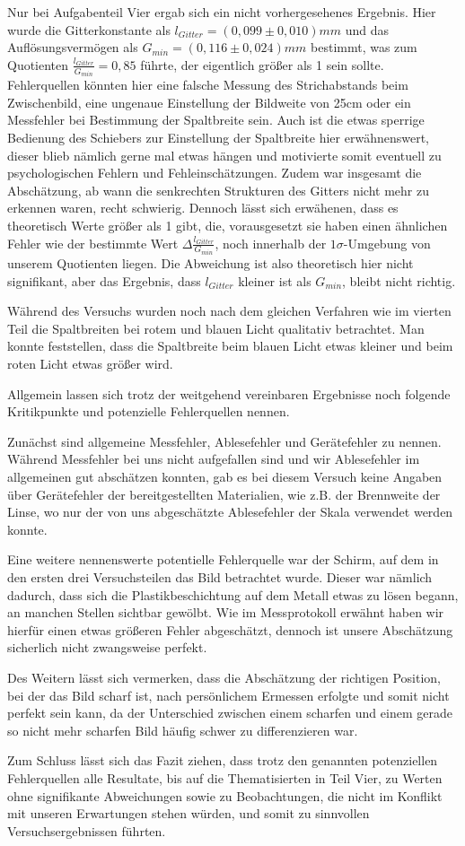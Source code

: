 \documentclass{article}
\begin{document}
Nur bei Aufgabenteil Vier ergab sich ein nicht vorhergesehenes Ergebnis. Hier wurde die Gitterkonstante als $l_{Gitter} = (0,099 \pm 0,010) mm$ und das Auflösungsvermögen als $G_{min} = (0,116 \pm 0,024)mm$ bestimmt, was zum Quotienten $\frac{l_{Gitter}}{G_{min}} = 0,85$ führte, der eigentlich größer als 1 sein sollte. Fehlerquellen könnten hier eine falsche Messung des Strichabstands beim Zwischenbild, eine ungenaue Einstellung der Bildweite von 25cm oder ein Messfehler bei Bestimmung der Spaltbreite sein. Auch ist die etwas sperrige Bedienung des Schiebers zur Einstellung der Spaltbreite hier erwähnenswert, dieser blieb nämlich gerne mal etwas hängen und motivierte somit eventuell zu psychologischen Fehlern und Fehleinschätzungen. Zudem war insgesamt die Abschätzung, ab wann die senkrechten Strukturen des Gitters nicht mehr zu erkennen waren, recht schwierig. Dennoch lässt sich erwähenen, dass es theoretisch Werte größer als 1 gibt, die, vorausgesetzt sie haben einen ähnlichen Fehler wie der bestimmte Wert $\Delta \frac{l_{Gitter}}{G_{min}}$, noch innerhalb der $1\sigma$-Umgebung von unserem Quotienten liegen. Die Abweichung ist also theoretisch hier nicht signifikant, aber das Ergebnis, dass $l_{Gitter}$ kleiner ist als $G_{min}$, bleibt nicht richtig. 

Während des Versuchs wurden noch nach dem gleichen Verfahren wie im vierten Teil die Spaltbreiten bei rotem und blauen Licht qualitativ betrachtet. Man konnte feststellen, dass die Spaltbreite beim blauen Licht etwas kleiner und beim roten Licht etwas größer wird. 

Allgemein lassen sich trotz der weitgehend vereinbaren Ergebnisse noch folgende Kritikpunkte und potenzielle Fehlerquellen nennen.

Zunächst sind allgemeine Messfehler, Ablesefehler und Gerätefehler zu nennen. Während Messfehler bei uns nicht aufgefallen sind und wir Ablesefehler im allgemeinen gut abschätzen konnten, gab es bei diesem Versuch keine Angaben über Gerätefehler der bereitgestellten Materialien, wie z.B. der Brennweite der Linse, wo nur der von uns abgeschätzte Ablesefehler der Skala verwendet werden konnte. 

Eine weitere nennenswerte potentielle Fehlerquelle war der Schirm, auf dem in den ersten drei Versuchsteilen das Bild betrachtet wurde. Dieser war nämlich dadurch, dass sich die Plastikbeschichtung auf dem Metall etwas zu lösen begann, an manchen Stellen sichtbar gewölbt. Wie im Messprotokoll erwähnt haben wir hierfür einen etwas größeren Fehler abgeschätzt, dennoch ist unsere Abschätzung sicherlich nicht zwangsweise perfekt.   

Des Weitern lässt sich vermerken, dass die Abschätzung der richtigen Position, bei der das Bild scharf ist, nach persönlichem Ermessen erfolgte und somit nicht perfekt sein kann, da der Unterschied zwischen einem scharfen und einem gerade so nicht mehr scharfen Bild häufig schwer zu differenzieren war. 

Zum Schluss lässt sich das Fazit ziehen, dass trotz den genannten potenziellen Fehlerquellen alle Resultate, bis auf die Thematisierten in Teil Vier, zu Werten ohne signifikante Abweichungen sowie zu Beobachtungen, die nicht im Konflikt mit unseren Erwartungen stehen würden, und somit zu sinnvollen Versuchsergebnissen führten.
\end{document}
